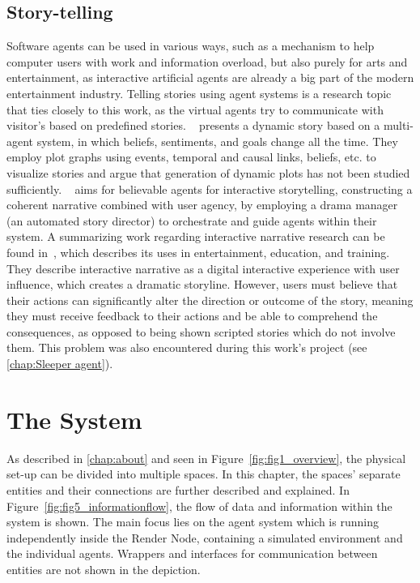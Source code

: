 \documentclass[draft,final]{vutinfth} %
\begin{document}
\section{Story-telling}
\label{chap:storytelling}

Software agents can be used in various ways, such as a mechanism to help computer users with work and information overload, but also purely for arts and entertainment, as interactive artificial agents are already a big part of the modern entertainment industry. 
Telling stories using agent systems is a research topic that ties closely to this work, as the virtual agents try to communicate with visitor’s based on predefined stories. 
~\cite{brenner2010creating} presents a dynamic story based on a multi-agent system, in which beliefs, sentiments, and goals change all the time. 
They employ plot graphs using events, temporal and causal links, beliefs, etc. to visualize stories and argue that generation of dynamic plots has not been studied sufficiently.
~\cite{10.1007/11944577_1} aims for believable agents for interactive storytelling, constructing a coherent narrative combined with user agency, by employing a drama manager (an automated story director) to orchestrate and guide agents within their system. 
A summarizing work regarding interactive narrative research can be found in~\cite{riedl2012interactive}, which describes its uses in entertainment, education, and training. 
They describe interactive narrative as a digital interactive experience with user influence, which creates a dramatic storyline. 
However, users must believe that their actions can significantly alter the direction or outcome of the story, meaning they must receive feedback to their actions and be able to comprehend the consequences, as opposed to being shown scripted stories which do not involve them. 
This problem was also encountered during this work’s project (see \autoref{chap:Sleeper agent}).

\chapter{The System}
\label{chap:thesystem}

As described in \autoref{chap:about} and seen in Figure~\ref{fig:fig1_overview}, the physical set-up can be divided into multiple spaces. 
In this chapter, the spaces’ separate entities and their connections are further described and explained. 
In Figure~\ref{fig:fig5_informationflow}, the flow of data and information within the system is shown. 
The main focus lies on the agent system which is running independently inside the Render Node, containing a simulated environment and the individual agents. 
Wrappers and interfaces for communication between entities are not shown in the depiction.
\end{document}
